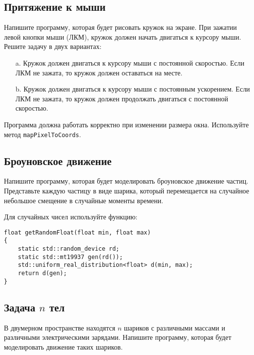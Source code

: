 \documentclass{article}
\begin{document}
\subsection{Притяжение к мыши}
Напишите программу, которая будет рисовать кружок на экране.
При зажатии левой кнопки мыши (ЛКМ), кружок должен начать двигаться к курсору мыши. Решите задачу в двух вариантах:
\begin{enumerate}
\item[a.] Кружок должен двигаться к курсору мыши с постоянной скоростью. Если ЛКМ не зажата, то кружок должен оставаться на месте.
\item[b.] Кружок должен двигаться к курсору мыши с постоянным ускорением. Если ЛКМ не зажата, то кружок должен продолжать двигаться с постоянной скоростью.
\end{enumerate}
Программа должна работать корректно при изменении размера окна. Используйте метод \texttt{mapPixelToCoords}.



\subsection{Броуновское движение}
Напишите программу, которая будет моделировать броуновское движение частиц. Представьте каждую частицу в виде шарика, который перемещается на случайное небольшое смещение в случайные моменты времени.

\newpage
Для случайных чисел используйте функцию:

\begin{lstlisting}
float getRandomFloat(float min, float max)
{
    static std::random_device rd;
    static std::mt19937 gen(rd());
    std::uniform_real_distribution<float> d(min, max);
    return d(gen);
}
\end{lstlisting}

\subsection{Задача $n$ тел}
В двумерном пространстве находятся $n$ шариков с различными массами и различными электрическими зарядами. Напишите программу, которая будет моделировать движение таких шариков.\\
\end{document}
